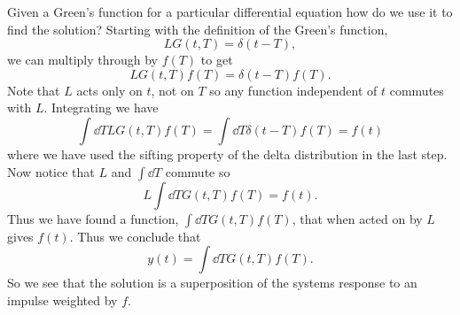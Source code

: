 \documentclass[a4paper]{article}
\begin{document}
    Given a Green's function for a particular differential equation how do we use it to find the solution?
    Starting with the definition of the Green's function,
    \[LG(t, T) = \delta(t - T),\]
    we can multiply through by \(f(T)\) to get
    \[LG(t, T)f(T) = \delta(t - T)f(T).\]
    Note that \(L\) acts only on \(t\), not on \(T\) so any function independent of \(t\) commutes with \(L\).
    Integrating we have
    \[\int \dd{T} LG(t, T)f(T) = \int \dd{T} \delta(t - T)f(T) = f(t)\]
    where we have used the sifting property of the delta distribution in the last step.
    Now notice that \(L\) and \(\int\dd{T}\) commute so
    \[L\int\dd{T}G(t, T)f(T) = f(t).\]
    Thus we have found a function, \(\int\dd{T}G(t, T)f(T)\), that when acted on by \(L\) gives \(f(t)\).
    Thus we conclude that
    \[y(t) = \int\dd{T}G(t, T)f(T).\]
    So we see that the solution is a superposition of the systems response to an impulse weighted by \(f\).
    
\end{document}
